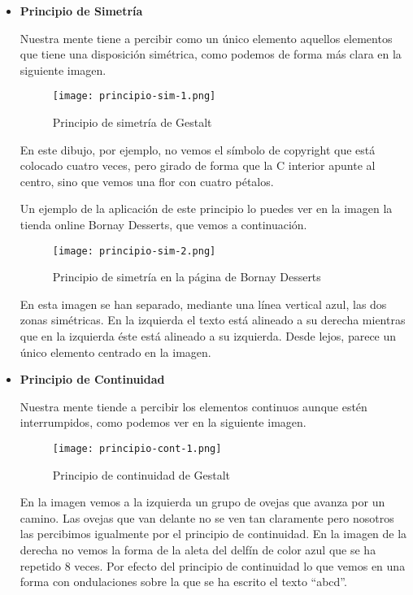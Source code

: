 \begin{itemize}
    \item \textbf{Principio de Simetría}

    Nuestra mente tiene a percibir como un único elemento aquellos elementos que tiene una disposición simétrica, como podemos de forma más clara en la siguiente imagen.

    \begin{figure}[H]
        \centering
        \texttt{[image: principio-sim-1.png]}
        \caption{Principio de simetría de Gestalt}
    \end{figure}

    En este dibujo, por ejemplo, no vemos el símbolo de copyright que está colocado cuatro veces, pero girado de forma que la C interior apunte al centro, sino que vemos una flor con cuatro pétalos.

    Un ejemplo de la aplicación de este principio lo puedes ver en la imagen la tienda online Bornay Desserts, que vemos a continuación.

    \begin{figure}[H]
        \centering
        \texttt{[image: principio-sim-2.png]}
        \caption{Principio de simetría en la página de Bornay Desserts}
    \end{figure}

    En esta imagen se han separado, mediante una línea vertical azul, las dos zonas simétricas. En la izquierda el texto está alineado a su derecha mientras que en la izquierda éste está alineado a su izquierda. Desde lejos, parece un único elemento centrado en la imagen.

    \item \textbf{Principio de Continuidad}

    Nuestra mente tiende a percibir los elementos continuos aunque estén interrumpidos, como podemos ver en la siguiente imagen.

    \begin{figure}[H]
        \centering
        \texttt{[image: principio-cont-1.png]}
        \caption{Principio de continuidad de Gestalt}
    \end{figure}

    En la imagen vemos a la izquierda un grupo de ovejas que avanza por un camino. Las ovejas que van delante no se ven tan claramente pero nosotros las percibimos igualmente por el principio de continuidad. En la imagen de la derecha no vemos la forma de la aleta del delfín de color azul que se ha repetido 8 veces. Por efecto del principio de continuidad lo que vemos en una forma con ondulaciones sobre la que se ha escrito el texto ``abcd''.


\end{itemize}
